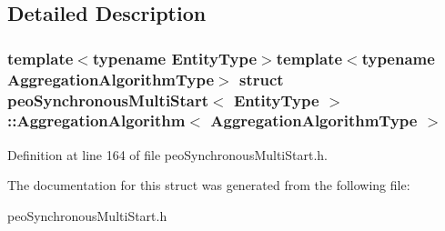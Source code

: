 \subsection{Detailed Description}
\subsubsection*{template$<$typename Entity\-Type$>$template$<$typename Aggregation\-Algorithm\-Type$>$ struct peo\-Synchronous\-Multi\-Start$<$ Entity\-Type $>$::Aggregation\-Algorithm$<$ Aggregation\-Algorithm\-Type $>$}





Definition at line 164 of file peo\-Synchronous\-Multi\-Start.h.

The documentation for this struct was generated from the following file:\begin{CompactItemize}
\item 
peo\-Synchronous\-Multi\-Start.h\end{CompactItemize}
